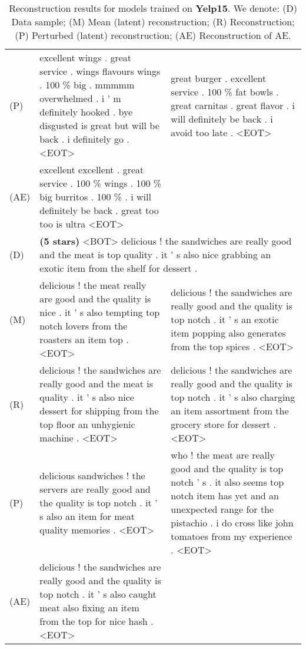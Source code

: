 \documentclass{article}
\begin{document}
\begin{table}[th]
{\begin{tabular}{l| p{8cm}|p{8cm} }
\hdashline[1pt/1pt]
(P) & excellent wings . great service . wings flavours wings . 100 \% big . mmmmm overwhelmed . i ' m definitely hooked . bye disgusted is great but will be back . i definitely go . \textsc{<EOT>} & great burger . excellent service . 100 \% fat bowls . great carnitas . great flavor . i will definitely be back . i avoid too late . \textsc{<EOT>} \\
\hdashline[1pt/1pt]
(AE) & excellent excellent . great service . 100 \% wings . 100 \% big burritos . 100 \% . i will definitely be back . great too too is ultra \textsc{<EOT>} &  \\
\hline 
        \hline 
        \rowcolor{Gray}
(D) & \multicolumn{2}{l}{\textbf{(5 stars)} \textsc{<BOT>} delicious ! the sandwiches are really good and the meat is top quality . it ' s also nice grabbing an exotic item from the shelf for dessert .}  \\
        \hline 
(M) & delicious ! the meat really are good and the quality is nice . it ' s also tempting top notch lovers from the roasters an item top . \textsc{<EOT>} & delicious ! the sandwiches are really good and the quality is top notch . it ' s an exotic item popping also generates from the top spices . \textsc{<EOT>} \\
\hdashline[1pt/1pt]
(R) & delicious ! the sandwiches are really good and the meat is quality . it ' s also nice dessert for shipping from the top floor an unhygienic machine . \textsc{<EOT>} & delicious ! the sandwiches are really good and the quality is top notch . it ' s also charging an item assortment from the grocery store for dessert . \textsc{<EOT>} \\
\hdashline[1pt/1pt]
(P) & delicious sandwiches ! the servers are really good and the quality is top notch . it ' s also an item for meat quality memories . \textsc{<EOT>} & who ! the meat are really good and the quality is top notch ' s . it also seems top notch item has yet and an unexpected range for the pistachio . i do cross like john tomatoes from my experience . \textsc{<EOT>} \\
\hdashline[1pt/1pt]
(AE) & delicious ! the sandwiches are really good and the quality is top notch . it ' s also caught meat also fixing an item from the top for nice hash . \textsc{<EOT>} &  \\
    \end{tabular}
    }
    \caption{
    Reconstruction results for models trained on \textbf{Yelp15}.
    We denote:
    (D) Data sample; 
    (M) Mean (latent) reconstruction;
    (R) Reconstruction;
    (P) Perturbed (latent) reconstruction;
    (AE) Reconstruction of AE.
    }
    \label{tab:nlp-recon-yelp-1}
\end{table}
\end{document}
